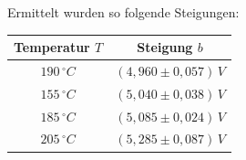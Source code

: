 \begin{center}
\begin{minipage}{\linewidth}
\label{graph_a2a}
\end{minipage}
\begin{minipage}{\linewidth}
\centering
{}
\label{graph_a2b}
\end{minipage}
\begin{minipage}{\linewidth}
\centering
{}
\label{graph_a2c}
\end{minipage}
\end{center}
\newpage
Ermittelt wurden so folgende Steigungen:
\begin{center}
\begin{tabular}{c|c}
Temperatur \(T\) & Steigung \(b\)\\\hline
\(190\, ^\circ C\) & \(\left( 4,960 \pm 0,057 \right) \, V\) \\
\(155\, ^\circ C\) & \(\left( 5,040 \pm 0,038 \right) \, V\) \\
\(185\, ^\circ C\) & \(\left( 5,085 \pm 0,024 \right) \, V\) \\
\(205\, ^\circ C\) & \(\left( 5,285 \pm 0,087 \right) \, V\) \\
\end{tabular}
\end{center}
